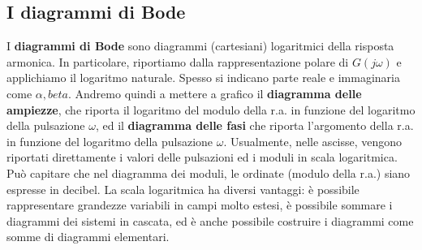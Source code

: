 \documentclass[11pt]{article}
\begin{document}
\subsection{I diagrammi di Bode}
I \textbf{diagrammi di Bode} sono diagrammi (cartesiani) logaritmici della risposta armonica. In particolare, riportiamo dalla rappresentazione polare di $G(j\omega)$ e applichiamo il logaritmo naturale. Spesso si indicano parte reale e immaginaria come $\alpha, beta$. Andremo quindi a mettere a grafico il \textbf{diagramma delle ampiezze}, che riporta il logaritmo del modulo della r.a. in funzione del logaritmo della pulsazione $\omega$, ed il \textbf{diagramma delle fasi} che riporta l'argomento della r.a. in funzione del logaritmo della pulsazione $\omega$.
Usualmente, nelle ascisse, vengono riportati direttamente i valori delle pulsazioni ed i moduli in scala logaritmica. Può capitare che nel diagramma dei moduli, le ordinate (modulo della r.a.) siano espresse in decibel. La scala logaritmica ha diversi vantaggi: è possibile rappresentare grandezze variabili in campi molto estesi, è possibile sommare i diagrammi dei sistemi in cascata, ed è anche possibile costruire i diagrammi come somme di diagrammi elementari. 
\end{document}
